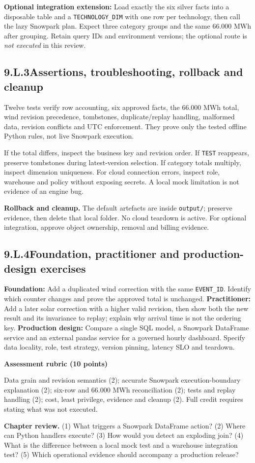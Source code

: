 \documentclass[11pt,twoside]{article}
\newcommand{\topic}[2]{\subsection*{#1\quad #2}}
\begin{document}
\textbf{Optional integration extension:} Load exactly the six silver facts into a disposable table and a \texttt{TECHNOLOGY\_DIM} with one row per technology, then call the lazy Snowpark plan. Expect three category groups and the same 66.000 MWh after grouping. Retain query IDs and environment versions; the optional route is \emph{not executed} in this review.
\newpage
\topic{9.L.3}{Assertions, troubleshooting, rollback and cleanup}
Twelve tests verify row accounting, six approved facts, the 66.000 MWh total, wind revision precedence, tombstones, duplicate/replay handling, malformed data, revision conflicts and UTC enforcement. They prove only the tested offline Python rules, not live Snowpark execution.

If the total differs, inspect the business key and revision order. If \texttt{TEST} reappears, preserve tombstones during latest-version selection. If category totals multiply, inspect dimension uniqueness. For cloud connection errors, inspect role, warehouse and policy without exposing secrets. A local mock limitation is not evidence of an engine bug.

\textbf{Rollback and cleanup.} The default artefacts are inside \texttt{output/}; preserve evidence, then delete that local folder. No cloud teardown is active. For optional integration, approve object ownership, removal and billing evidence.
\topic{9.L.4}{Foundation, practitioner and production-design exercises}
\textbf{Foundation:} Add a duplicated wind correction with the same \texttt{EVENT\_ID}. Identify which counter changes and prove the approved total is unchanged. \textbf{Practitioner:} Add a later solar correction with a higher valid revision, then show both the new result and its invariance to replay; explain why arrival time is not the ordering key. \textbf{Production design:} Compare a single SQL model, a Snowpark DataFrame service and an external pandas service for a governed hourly dashboard. Specify data locality, role, test strategy, version pinning, latency SLO and teardown.
\begin{whitebox}\textbf{Assessment rubric (10 points)}\par
Data grain and revision semantics (2); accurate Snowpark execution-boundary explanation (2); six-row and 66.000 MWh reconciliation (2); tests and replay handling (2); cost, least privilege, evidence and cleanup (2). Full credit requires stating what was not executed.\end{whitebox}
\textbf{Chapter review.} (1) What triggers a Snowpark DataFrame action? (2) Where can Python handlers execute? (3) How would you detect an exploding join? (4) What is the difference between a local mock test and a warehouse integration test? (5) Which operational evidence should accompany a production release?
\end{document}
